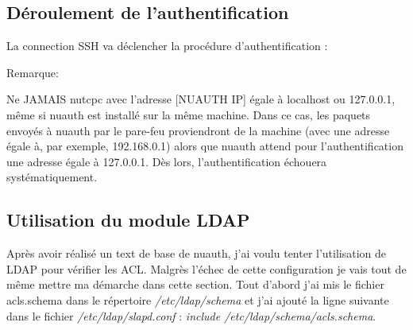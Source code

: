 \documentclass[12pt]{report}
\begin{document}
\begin{itemize}
\subsection{Déroulement de l'authentification}
La connection SSH va déclencher la procédure d’authentification :

Remarque:

Ne JAMAIS nutcpc avec l’adresse [NUAUTH IP] égale à localhost ou 127.0.0.1, même si nuauth 
est installé sur la même machine. Dans ce cas, les paquets envoyés à nuauth 
par le pare-feu proviendront de la machine (avec une adresse égale à, par exemple,
192.168.0.1) alors que nuauth attend pour l’authentification une adresse égale à 127.0.0.1. 
Dès lors, l’authentification échouera systématiquement.

\subsection{Utilisation du module LDAP}
Après avoir réalisé un text de base de nuauth, j'ai voulu tenter l'utilisation de LDAP pour vérifier les ACL. Malgrès l'échec 
de cette configuration je vais tout de même mettre ma démarche dans cette section. Tout d'abord j'ai mis le fichier 
acls.schema dans le répertoire \textit{/etc/ldap/schema} et j'ai ajouté la ligne suivante dans le fichier \textit{/etc/ldap/slapd.conf} : 
\textit{include  /etc/ldap/schema/acls.schema}.


\end{itemize}
\end{document}
